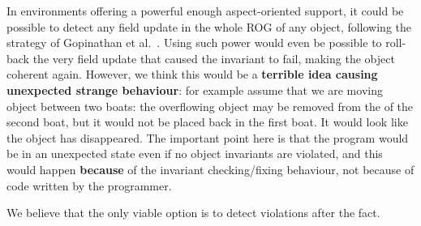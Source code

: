 In environments offering a powerful enough aspect-oriented support,
it could be possible to detect any field update in the whole ROG of
any object, following the strategy of 
Gopinathan et al.~\cite{Gopinathan:2008:RMO:1483018.1483028}.
Using such power would even be possible to roll-back the very field update that caused 
the invariant to fail, making the object coherent again.
However, we think this would be a \textbf{terrible idea causing unexpected strange behaviour}: for example
assume that we are moving object between two boats:
the overflowing object may be removed from the \Q@cargo@ of the second boat, but it would not
be placed back in the first boat. It would look like the object has disappeared.
The important point here is that the program would be in an unexpected state
even if no object invariants are violated, and this would happen \textbf{because} of the 
invariant checking/fixing behaviour, not because of code written by the programmer.

We believe that the only viable option is to detect violations after the fact.



